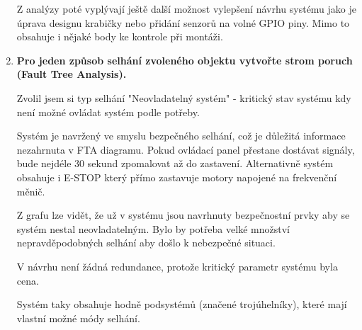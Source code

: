 \documentclass[10pt]{article} %
\begin{document}
\begin{enumerate}
		Z analýzy poté vyplývají ještě další možnost vylepšení návrhu systému jako je úprava designu krabičky nebo přidání senzorů na volné GPIO piny. Mimo to obsahuje i nějaké body ke kontrole při montáži.
		
		\clearpage
				
		\item \textbf{Pro jeden způsob selhání zvoleného objektu vytvořte strom poruch (Fault Tree Analysis).}
		
		Zvolil jsem si typ selhání "Neovladatelný systém" - kritický stav systému kdy není možné ovládat systém podle potřeby.
		
		Systém je navržený ve smyslu bezpečného selhání, což je důležitá informace nezahrnuta v FTA diagramu. Pokud ovládací panel přestane dostávat signály, bude nejdéle 30 sekund zpomalovat až do zastavení. Alternativně systém obsahuje i E-STOP který přímo zastavuje motory napojené na frekvenční měnič.
		
		Z grafu lze vidět, že už v systému jsou navrhnuty bezpečnostní prvky aby se systém nestal neovladatelným. Bylo by potřeba velké množství nepravděpodobných selhání aby došlo k nebezpečné situaci. 
		
		V návrhu není žádná redundance, protože kritický parametr systému byla cena.
		
		Systém taky obsahuje hodně podsystémů (značené trojúhelníky), které mají vlastní možné módy selhání.
		
	\end{enumerate}
	
	\printbibliography
	
\end{document}
